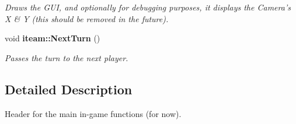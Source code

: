 \begin{CompactItemize}
\begin{CompactList}\small\item\em Draws the GUI, and optionally for debugging purposes, it displays the Camera's X \& Y (this should be removed in the future). \item\end{CompactList}\item 
void {\bf iteam::NextTurn} ()\label{namespaceiteam_9e23f9d383055dc5f46065e6fec82aa6}

\begin{CompactList}\small\item\em Passes the turn to the next player. \item\end{CompactList}\end{CompactItemize}


\subsection{Detailed Description}
Header for the main in-game functions (for now). 

